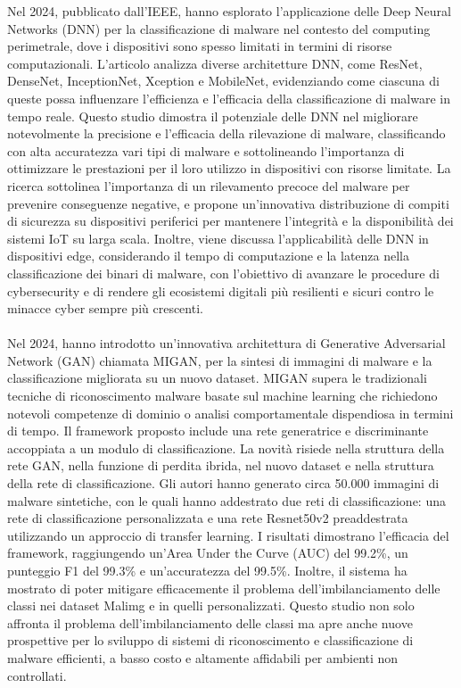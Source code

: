 Nel 2024, pubblicato dall'IEEE,  hanno esplorato l'applicazione delle Deep Neural Networks (DNN) per la classificazione di malware nel contesto del computing perimetrale, dove i dispositivi sono spesso limitati in termini di risorse computazionali. L'articolo analizza diverse architetture DNN, come ResNet, DenseNet, InceptionNet, Xception e MobileNet, evidenziando come ciascuna di queste possa influenzare l'efficienza e l'efficacia della classificazione di malware in tempo reale. Questo studio dimostra il potenziale delle DNN nel migliorare notevolmente la precisione e l'efficacia della rilevazione di malware, classificando con alta accuratezza vari tipi di malware e sottolineando l'importanza di ottimizzare le prestazioni per il loro utilizzo in dispositivi con risorse limitate. La ricerca sottolinea l'importanza di un rilevamento precoce del malware per prevenire conseguenze negative, e propone un'innovativa distribuzione di compiti di sicurezza su dispositivi periferici per mantenere l'integrità e la disponibilità dei sistemi IoT su larga scala. Inoltre, viene discussa l'applicabilità delle DNN in dispositivi edge, considerando il tempo di computazione e la latenza nella classificazione dei binari di malware, con l'obiettivo di avanzare le procedure di cybersecurity e di rendere gli ecosistemi digitali più resilienti e sicuri contro le minacce cyber sempre più crescenti.\\\\
Nel 2024,  hanno introdotto un'innovativa architettura di Generative Adversarial Network (GAN) chiamata MIGAN, per la sintesi di immagini di malware e la classificazione migliorata su un nuovo dataset. MIGAN supera le tradizionali tecniche di riconoscimento malware basate sul machine learning che richiedono notevoli competenze di dominio o analisi comportamentale dispendiosa in termini di tempo. Il framework proposto include una rete generatrice e discriminante accoppiata a un modulo di classificazione. La novità risiede nella struttura della rete GAN, nella funzione di perdita ibrida, nel nuovo dataset e nella struttura della rete di classificazione. Gli autori hanno generato circa 50.000 immagini di malware sintetiche, con le quali hanno addestrato due reti di classificazione: una rete di classificazione personalizzata e una rete Resnet50v2 preaddestrata utilizzando un approccio di transfer learning. I risultati dimostrano l'efficacia del framework, raggiungendo un'Area Under the Curve (AUC) del 99.2\%, un punteggio F1 del 99.3\% e un'accuratezza del 99.5\%. Inoltre, il sistema ha mostrato di poter mitigare efficacemente il problema dell'imbilanciamento delle classi nei dataset Malimg e in quelli personalizzati. Questo studio non solo affronta il problema dell'imbilanciamento delle classi ma apre anche nuove prospettive per lo sviluppo di sistemi di riconoscimento e classificazione di malware efficienti, a basso costo e altamente affidabili per ambienti non controllati.\\\\
